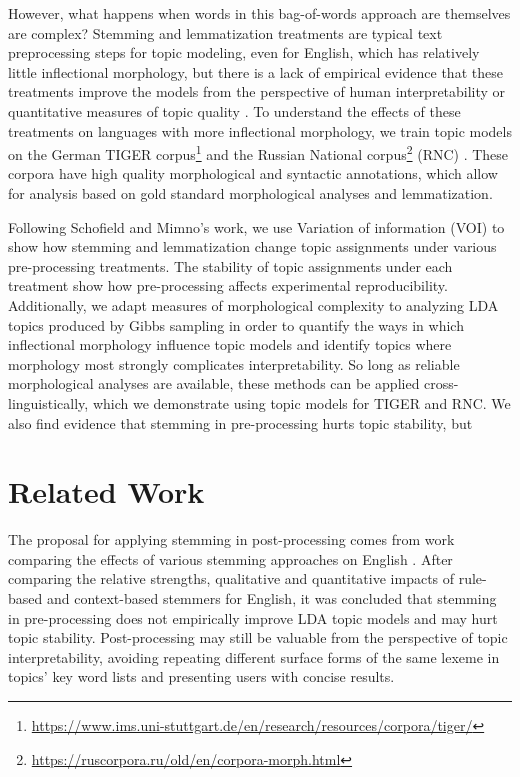 \documentclass[11pt,a4paper]{article}
\begin{document}
However, what happens when words in this bag-of-words approach are themselves are complex? Stemming and lemmatization treatments are typical text preprocessing steps for topic modeling, even for English, which has relatively little inflectional morphology, but there is a lack of empirical evidence that these treatments improve the models from the perspective of human interpretability or quantitative measures of topic quality \cite{schofield-mimno-2016-comparing}. To understand the effects of these treatments on languages with more inflectional morphology, we train topic models on the German TIGER corpus\footnote{\url{https://www.ims.uni-stuttgart.de/en/research/resources/corpora/tiger/}} \cite{Brants2004TIGERLI} and the Russian National corpus\footnote{\url{https://ruscorpora.ru/old/en/corpora-morph.html}} (RNC) \cite{Apresjan2006ASA}. These corpora have high quality morphological and syntactic annotations, which allow for analysis based on gold standard morphological analyses and lemmatization.

Following Schofield and Mimno's work, we use Variation of information (VOI) to show how stemming and lemmatization change topic assignments under various pre-processing treatments. The stability of topic assignments under each treatment show how pre-processing affects experimental reproducibility. Additionally, we adapt measures of morphological complexity to analyzing LDA topics produced by Gibbs sampling in order to quantify the ways in which inflectional morphology influence topic models and identify topics where morphology most strongly complicates interpretability. So long as reliable morphological analyses are available, these methods can be applied cross-linguistically, which we demonstrate using topic models for TIGER and RNC. We also find evidence that stemming in pre-processing hurts topic stability, but


\section{Related Work}
The proposal for applying stemming in post-processing comes from work comparing the effects of various stemming approaches on English \cite{schofield-mimno-2016-comparing}. After comparing the relative strengths, qualitative and quantitative impacts of rule-based and context-based stemmers for English, it was concluded that stemming in pre-processing does not empirically improve LDA topic models and may hurt topic stability. Post-processing may still be valuable from the perspective of topic interpretability, avoiding repeating different surface forms of the same lexeme in topics' key word lists and presenting users with concise results.
\end{document}
